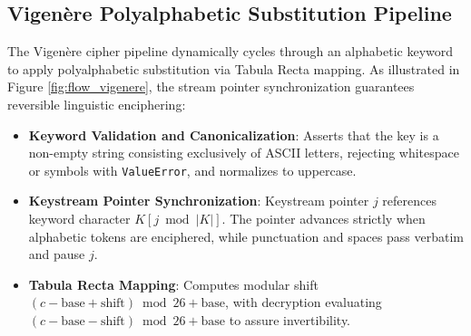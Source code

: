 \documentclass[12pt,a4paper]{report}
\begin{document}
\clearpage

\subsection{Vigen\`ere Polyalphabetic Substitution Pipeline}
The Vigen\`ere cipher pipeline dynamically cycles through an alphabetic keyword to apply polyalphabetic substitution via Tabula Recta mapping. As illustrated in Figure \ref{fig:flow_vigenere}, the stream pointer synchronization guarantees reversible linguistic enciphering:
\begin{itemize}[leftmargin=1.5em,topsep=1pt,itemsep=1pt,parsep=0pt]
    \item \textbf{Keyword Validation and Canonicalization}: Asserts that the key is a non-empty string consisting exclusively of ASCII letters, rejecting whitespace or symbols with \texttt{ValueError}, and normalizes to uppercase.
    \item \textbf{Keystream Pointer Synchronization}: Keystream pointer $j$ references keyword character $K[j \bmod |K|]$. The pointer advances strictly when alphabetic tokens are enciphered, while punctuation and spaces pass verbatim and pause $j$.
    \item \textbf{Tabula Recta Mapping}: Computes modular shift $(c - \text{base} + \text{shift}) \bmod 26 + \text{base}$, with decryption evaluating $(c - \text{base} - \text{shift}) \bmod 26 + \text{base}$ to assure invertibility.
\end{itemize}
\end{document}
